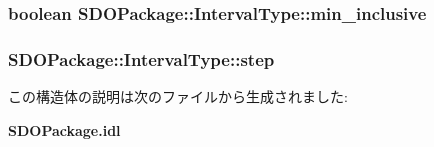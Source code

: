 \subsubsection[{min\_\-inclusive}]{\setlength{\rightskip}{0pt plus 5cm}boolean {\bf SDOPackage::IntervalType::min\_\-inclusive}}\label{structSDOPackage_1_1IntervalType_a1c39de81fb0c54339e906701a0874ef0}
\subsubsection[{step}]{ {\bf SDOPackage::IntervalType::step}}\label{structSDOPackage_1_1IntervalType_a8adfa6cc83bff1b0998457429290958f}


この構造体の説明は次のファイルから生成されました:\begin{DoxyCompactItemize}
\item 
{\bf SDOPackage.idl}\end{DoxyCompactItemize}
